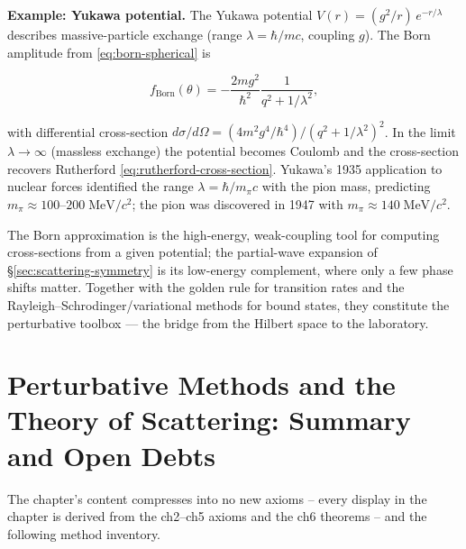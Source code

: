 \medskip\noindent\textbf{Example: Yukawa potential.}
The Yukawa potential $V(r)=(g^{2}/r)\,e^{-r/\lambda}$ describes massive-particle exchange (range $\lambda=\hbar/mc$, coupling $g$). The Born amplitude from \eqref{eq:born-spherical} is
\begin{linenomath}
\begin{equation}
f_{\text{Born}}(\theta)=-\frac{2mg^{2}}{\hbar^{2}}\frac{1}{q^{2}+1/\lambda^{2}},
\label{eq:born-yukawa}
\end{equation}
\end{linenomath}
with differential cross-section $d\sigma/d\Omega=(4m^{2}g^{4}/\hbar^{4})/(q^{2}+1/\lambda^{2})^{2}$. In the limit $\lambda\to\infty$ (massless exchange) the potential becomes Coulomb and the cross-section recovers Rutherford \eqref{eq:rutherford-cross-section}. Yukawa's 1935 application to nuclear forces identified the range $\lambda=\hbar/m_{\pi}c$ with the pion mass, predicting $m_{\pi}\approx100$--$200\;\mathrm{MeV}/c^{2}$; the pion was discovered in 1947 with $m_{\pi}\approx140\;\mathrm{MeV}/c^{2}$.

The Born approximation is the high-energy, weak-coupling tool for computing cross-sections from a given potential; the partial-wave expansion of \S\ref{sec:scattering-symmetry} is its low-energy complement, where only a few phase shifts matter. Together with the golden rule for transition rates and the Rayleigh--Schrodinger/variational methods for bound states, they constitute the perturbative toolbox --- the bridge from the Hilbert space to the laboratory.

\section{Perturbative Methods and the Theory of Scattering: Summary and Open Debts}
\label{sec:ch8summary}

The chapter's content compresses into no new axioms -- every display in the chapter is derived from the ch2--ch5 axioms and the ch6 theorems -- and the following method inventory.

